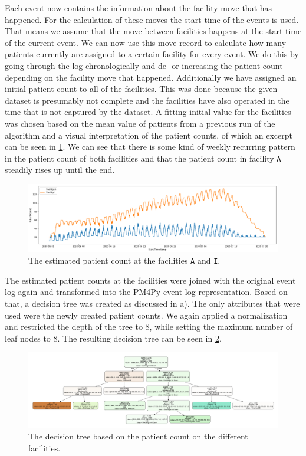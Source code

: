\documentclass[12pt]{report}
\begin{document}
Each event now contains the information about the facility move that has happened. For the calculation of these moves the start time of the events is used. That means we assume that the move between facilities happens at the start time of the current event. We can now use this move record to calculate how many patients currently are assigned to a certain facility for every event. We do this by going through the log chronologically and de- or increasing the patient count depending on the facility move that happened. Additionally we have assigned an initial patient count to all of the facilities. This was done because the given dataset is presumably not complete and the facilities have also operated in the time that is not captured by the dataset. A fitting initial value for the facilities was chosen based on the mean value of patients from a previous run of the algorithm and a visual interpretation of the patient counts, of which an excerpt can be seen in \ref{fig:figures-q4-fac-count-png}. We can see that there is some kind of weekly recurring pattern in the patient count of both facilities and that the patient count in facility \texttt{A} steadily rises up until the end.

\begin{figure}[h]
    \centering
    \includegraphics[width=\textwidth]{figures/q4_fac_count.png}
    \caption{The estimated patient count at the facilities \texttt{A} and \texttt{I}.}
    \label{fig:figures-q4-fac-count-png}
\end{figure}

The estimated patient counts at the facilities were joined with the original event log again and transformed into the PM4Py event log representation. Based on that, a decision tree was created as discussed in a). The only attributes that were used were the newly created patient counts. We again applied a normalization and restricted the depth of the tree to 8, while setting the maximum number of leaf nodes to 8. The resulting decision tree can be seen in \ref{fig:figures-q4-facility-tree-png}.

\begin{figure}[h]
    \centering
    \includegraphics[width=\textwidth]{figures/q4_facility_tree.png}
    \caption{The decision tree based on the patient count on the different facilities.}
    \label{fig:figures-q4-facility-tree-png}
\end{figure}
\end{document}
